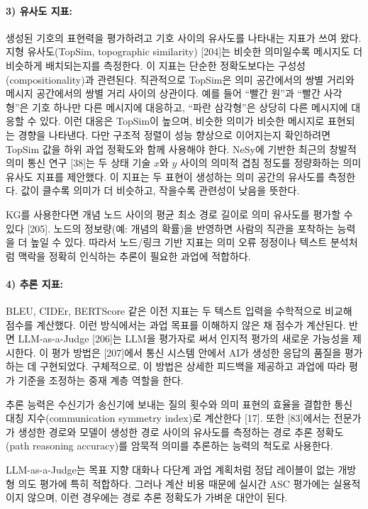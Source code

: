 \paragraph{3) 유사도 지표:}
생성된 기호의 표현력을 평가하려고 기호 사이의 유사도를 나타내는 지표가 쓰여 왔다. 지형 유사도(TopSim, topographic similarity) [204]는 비슷한 의미일수록 메시지도 더 비슷하게 배치되는지를 측정한다. 이 지표는 단순한 정확도보다는 구성성(compositionality)과 관련된다. 직관적으로 TopSim은 의미 공간에서의 쌍별 거리와 메시지 공간에서의 쌍별 거리 사이의 상관이다. 예를 들어 ``빨간 원''과 ``빨간 사각형''은 기호 하나만 다른 메시지에 대응하고, ``파란 삼각형''은 상당히 다른 메시지에 대응할 수 있다. 이런 대응은 TopSim이 높으며, 비슷한 의미가 비슷한 메시지로 표현되는 경향을 나타낸다. 다만 구조적 정렬이 성능 향상으로 이어지는지 확인하려면 TopSim 값을 하위 과업 정확도와 함께 사용해야 한다. NeSy에 기반한 최근의 창발적 의미 통신 연구 [38]는 두 상태 기술 $x$와 $y$ 사이의 의미적 겹침 정도를 정량화하는 의미 유사도 지표를 제안했다. 이 지표는 두 표현이 생성하는 의미 공간의 유사도를 측정한다. 값이 클수록 의미가 더 비슷하고, 작을수록 관련성이 낮음을 뜻한다.

KG를 사용한다면 개념 노드 사이의 평균 최소 경로 길이로 의미 유사도를 평가할 수 있다 [205]. 노드의 정보량(예: 개념의 확률)을 반영하면 사람의 직관을 포착하는 능력을 더 높일 수 있다. 따라서 노드/링크 기반 지표는 의미 오류 정정이나 텍스트 분석처럼 맥락을 정확히 인식하는 추론이 필요한 과업에 적합하다.

\paragraph{4) 추론 지표:}
BLEU, CIDEr, BERTScore 같은 이전 지표는 두 텍스트 입력을 수학적으로 비교해 점수를 계산했다. 이런 방식에서는 과업 목표를 이해하지 않은 채 점수가 계산된다. 반면 LLM-as-a-Judge [206]는 LLM을 평가자로 써서 인지적 평가의 새로운 가능성을 제시한다. 이 평가 방법은 [207]에서 통신 시스템 안에서 AI가 생성한 응답의 품질을 평가하는 데 구현되었다. 구체적으로, 이 방법은 상세한 피드백을 제공하고 과업에 따라 평가 기준을 조정하는 중재 계층 역할을 한다.

추론 능력은 수신기가 송신기에 보내는 질의 횟수와 의미 표현의 효율을 결합한 통신 대칭 지수(communication symmetry index)로 계산한다 [17]. 또한 [83]에서는 전문가가 생성한 경로와 모델이 생성한 경로 사이의 유사도를 측정하는 경로 추론 정확도(path reasoning accuracy)를 암묵적 의미를 추론하는 능력의 척도로 사용한다.

LLM-as-a-Judge는 목표 지향 대화나 다단계 과업 계획처럼 정답 레이블이 없는 개방형 의도 평가에 특히 적합하다. 그러나 계산 비용 때문에 실시간 ASC 평가에는 실용적이지 않으며, 이런 경우에는 경로 추론 정확도가 가벼운 대안이 된다.

